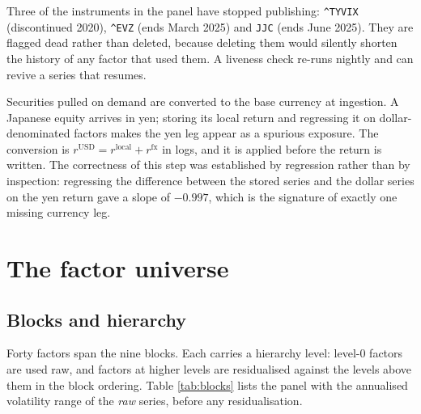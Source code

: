 \documentclass[11pt,a4paper]{article}
\newcommand{\code}[1]{\texttt{\small #1}}
\begin{document}
Three of the instruments in the panel have stopped publishing: \code{\^{}TYVIX}
(discontinued 2020), \code{\^{}EVZ} (ends March 2025) and \code{JJC} (ends June
2025). They are flagged dead rather than deleted, because deleting them would
silently shorten the history of any factor that used them. A liveness check re-runs
nightly and can revive a series that resumes.

Securities pulled on demand are converted to the base currency at ingestion. A
Japanese equity arrives in yen; storing its local return and regressing it on
dollar-denominated factors makes the yen leg appear as a spurious exposure. The
conversion is $r^{\mathrm{USD}} = r^{\mathrm{local}} + r^{\mathrm{fx}}$ in logs, and
it is applied before the return is written. The correctness of this step was
established by regression rather than by inspection: regressing the difference
between the stored series and the dollar series on the yen return gave a slope of
$-0.997$, which is the signature of exactly one missing currency leg.

\section{The factor universe}
\label{sec:factors}

\subsection{Blocks and hierarchy}

Forty factors span the nine blocks. Each carries a hierarchy level: level-0 factors
are used raw, and factors at higher levels are residualised against the levels above
them in the block ordering. Table \ref{tab:blocks} lists the panel with the
annualised volatility range of the \emph{raw} series, before any residualisation.
\end{document}
